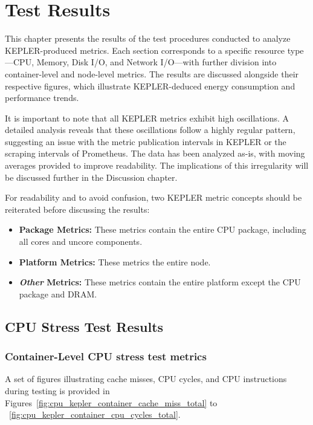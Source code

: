 
\chapter{Test Results}
\label{Chapter5}

This chapter presents the results of the test procedures conducted to analyze KEPLER-produced metrics. Each section corresponds to a specific resource type—CPU, Memory, Disk I/O, and Network I/O—with further division into container-level and node-level metrics. The results are discussed alongside their respective figures, which illustrate KEPLER-deduced energy consumption and performance trends. 

It is important to note that all KEPLER metrics exhibit high oscillations. A detailed analysis reveals that these oscillations follow a highly regular pattern, suggesting an issue with the metric publication intervals in KEPLER or the scraping intervals of Prometheus. The data has been analyzed as-is, with moving averages provided to improve readability. The implications of this irregularity will be discussed further in the Discussion chapter.

For readability and to avoid confusion, two KEPLER metric concepts should be reiterated before discussing the results:
\begin{itemize}
    \item \textbf{Package Metrics:} These metrics contain the entire CPU package, including all cores and uncore components.
    \item \textbf{Platform Metrics:} These metrics the entire node.
    \item \textbf{\textit{Other} Metrics:} These metrics contain the entire platform except the CPU package and DRAM.
\end{itemize}

\section{CPU Stress Test Results}
\subsection{Container-Level CPU stress test metrics}

A set of figures illustrating cache misses, CPU cycles, and CPU instructions during testing is provided in Figures~\ref{fig:cpu_kepler_container_cache_miss_total} to ~\ref{fig:cpu_kepler_container_cpu_cycles_total}.

